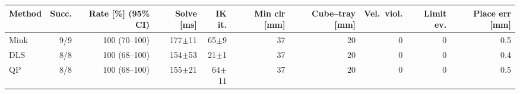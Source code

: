 \begin{tabular}{lrrrrrrrrr}
\toprule
Method & Succ. & Rate [\%] (95\% CI) & Solve [ms] & IK it. & Min clr [mm] & Cube--tray [mm] & Vel.\ viol. & Limit ev. & Place err [mm]\\
\midrule
Mink & 9/9 & 100 (70--100) & 177$\pm$11 & 65$\pm$9 & 37 & 20 & 0 & 0 & 0.5\\
DLS & 8/8 & 100 (68--100) & 154$\pm$53 & 21$\pm$1 & 37 & 20 & 0 & 0 & 0.4\\
QP & 8/8 & 100 (68--100) & 155$\pm$21 & 64$\pm$11 & 37 & 20 & 0 & 0 & 0.5\\
\bottomrule
\end{tabular}
